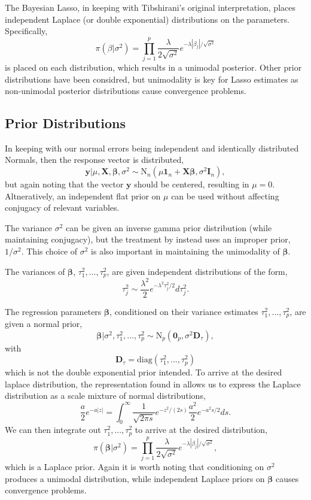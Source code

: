 \documentclass{uwstat572}
\begin{document}
The Bayesian Lasso, in keeping with Tibshirani's original interpretation, places independent Laplace (or double exponential) distributions on the parameters. Specifically, \[
\pi(\beta|\sigma^2)=\prod_{j=1}^p\frac{\lambda}{2\sqrt{\sigma^2}}e^{-\lambda |\beta_j|/\sqrt{\sigma^2}}
\] is placed on each distribution, which results in a unimodal posterior. Other prior distributions have been considred, but unimodality is key for Lasso estimates as non-unimodal posterior distributions cause convergence problems.

\subsection{Prior Distributions}
In keeping with our normal errors being independent and identically distributed Normals, then the response vector is distributed, \[
\mathbf{y}|\mu,\mathbf{X},\boldsymbol\beta,\sigma^2 \sim \text{N}_n(\mu \mathbf{1}_n+\mathbf{X}\boldsymbol\beta,\sigma^2\mathbf{I}_n), \] but again noting that the vector $\mathbf{y}$ should be centered, resulting in $\mu=0$. Altneratively, an independent flat prior on $\mu$ can be used without affecting conjugacy of relevant variables.

The variance $\sigma^2$ can be given an inverse gamma prior distribution (while maintaining conjugacy), but the treatment by \cite{park2008bayesian} instead uses an improper prior, $1/\sigma^2$. This choice of $\sigma^2$ is also important in maintaining the unimodality of $\boldsymbol\beta$.

The variances of $\boldsymbol\beta$, $\tau_1^2,...,\tau_p^2$, are given independent distributions of the form, \[ \tau^2_j \sim \frac{\lambda^2}{2}e^{-\lambda^2\tau^2_j/2}d\tau^2_j.\] 

The regression parameters $\boldsymbol\beta$, conditioned on their variance estimates $\tau_1^2,...,\tau_p^2$, are given a normal prior, \[ 
\boldsymbol\beta|\sigma^2,\tau^2_1,...,\tau^2_p\sim\text{N}_p(\mathbf{0}_p,\sigma^2\mathbf{D}_\tau),\] with \[ \mathbf{D}_\tau=\text{diag}(\tau_1^2,...,\tau^2_p) \] which is not the double exponential prior intended. To arrive at the desired laplace distribution, the representation found in \cite{andrews1974scale} allows us to express the Laplace distribution as a scale mixture of normal distributions, \[ \frac{a}{2}e^{-a|z|}=\int^\infty_0
\frac{1}{\sqrt{2\pi s}}e^{-z^2/(2s)}\frac{a^2}{2}e^{-a^2s/2}ds.\] We can then integrate out $\tau^2_1,...,\tau^2_p$ to arrive at the desired distribution, \[ \pi(\boldsymbol\beta|\sigma^2)=\prod^p_{j=1}\frac{\lambda}{2\sqrt{\sigma^2}}e^{-\lambda|\beta_j|/\sqrt{\sigma^2}}, \] which is a Laplace prior. Again it is worth noting that conditioning on $\sigma^2$ produces a unimodal distribution, while independent Laplace priors on $\boldsymbol\beta$ causes convergence problems.
\end{document}
